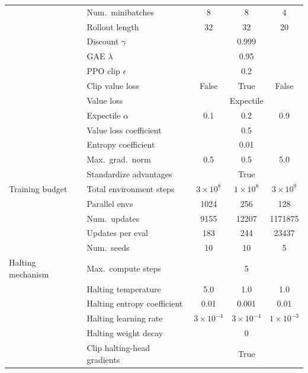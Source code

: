 \begin{table}[p]
\begin{tabular}{llccc}
  & Num.\ minibatches & 8 & 8 & 4 \\
  & Rollout length & 32 & 32 & 20 \\
  & Discount $\gamma$ & \multicolumn{3}{c}{0.999} \\
  & GAE $\lambda$ & \multicolumn{3}{c}{0.95} \\
  & PPO clip $\epsilon$ & \multicolumn{3}{c}{0.2} \\
  & Clip value loss & False & True & False \\
  & Value loss & \multicolumn{3}{c}{Expectile} \\
  & Expectile $\alpha$ & 0.1 & 0.2 & 0.9 \\
  & Value loss coefficient & \multicolumn{3}{c}{0.5} \\
  & Entropy coefficient & \multicolumn{3}{c}{0.01} \\
  & Max.\ grad.\ norm & 0.5 & 0.5 & 5.0 \\
  & Standardize advantages & \multicolumn{3}{c}{True} \\
\midrule
Training budget
  & Total environment steps & $3\times10^{8}$ & $1\times10^{8}$ & $3\times10^{9}$ \\
  & Parallel envs & 1024 & 256 & 128 \\
  & Num.\ updates & 9155 & 12207 & 1171875 \\
  & Updates per eval & 183 & 244 & 23437 \\
  & Num.\ seeds & 10 & 10 & 5 \\
\midrule
Halting mechanism
  & Max.\ compute steps & \multicolumn{3}{c}{5} \\
  & Halting temperature & 5.0 & 1.0 & 1.0 \\
  & Halting entropy coefficient & 0.01 & 0.001 & 0.01 \\
  & Halting learning rate & $3\times10^{-4}$ & $3\times10^{-4}$ & $1\times10^{-3}$ \\
  & Halting weight decay & \multicolumn{3}{c}{0} \\
  & Clip halting-head gradients & \multicolumn{3}{c}{True} \\
\bottomrule
\end{tabular}
\label{tab:hyperparams_main}
\end{table}